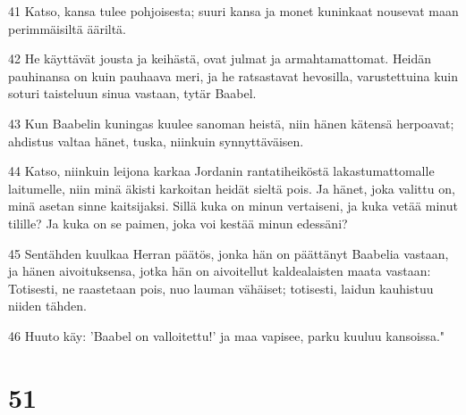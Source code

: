 \par 41 Katso, kansa tulee pohjoisesta; suuri kansa ja monet kuninkaat nousevat maan perimmäisiltä ääriltä.
\par 42 He käyttävät jousta ja keihästä, ovat julmat ja armahtamattomat. Heidän pauhinansa on kuin pauhaava meri, ja he ratsastavat hevosilla, varustettuina kuin soturi taisteluun sinua vastaan, tytär Baabel.
\par 43 Kun Baabelin kuningas kuulee sanoman heistä, niin hänen kätensä herpoavat; ahdistus valtaa hänet, tuska, niinkuin synnyttäväisen.
\par 44 Katso, niinkuin leijona karkaa Jordanin rantatiheiköstä lakastumattomalle laitumelle, niin minä äkisti karkoitan heidät sieltä pois. Ja hänet, joka valittu on, minä asetan sinne kaitsijaksi. Sillä kuka on minun vertaiseni, ja kuka vetää minut tilille? Ja kuka on se paimen, joka voi kestää minun edessäni?
\par 45 Sentähden kuulkaa Herran päätös, jonka hän on päättänyt Baabelia vastaan, ja hänen aivoituksensa, jotka hän on aivoitellut kaldealaisten maata vastaan: Totisesti, ne raastetaan pois, nuo lauman vähäiset; totisesti, laidun kauhistuu niiden tähden.
\par 46 Huuto käy: 'Baabel on valloitettu!' ja maa vapisee, parku kuuluu kansoissa."

\chapter{51}

